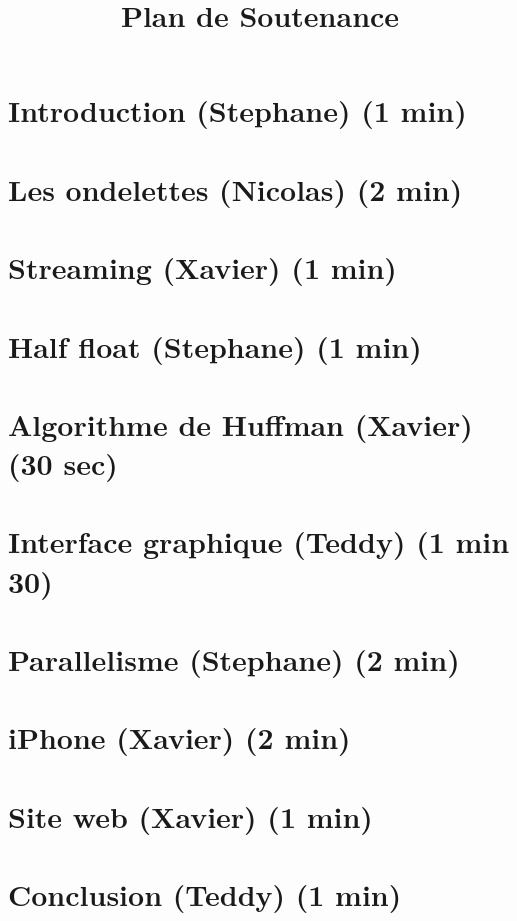 \documentclass[a4paper,12pt]{article}
\begin{document}
\title{Plan de Soutenance}
\maketitle
\section{Introduction (Stephane) (1 min)}
\section{Les ondelettes (Nicolas) (2 min)}
\section{Streaming (Xavier) (1 min)}
\section{Half float (Stephane) (1 min)}
\section{Algorithme de Huffman (Xavier) (30 sec)}
\section{Interface graphique (Teddy) (1 min 30)}
\section{Parallelisme (Stephane) (2 min)}
\section{iPhone (Xavier) (2 min)}
\section{Site web (Xavier) (1 min)}
\section{Conclusion (Teddy) (1 min)}
\end{document}
